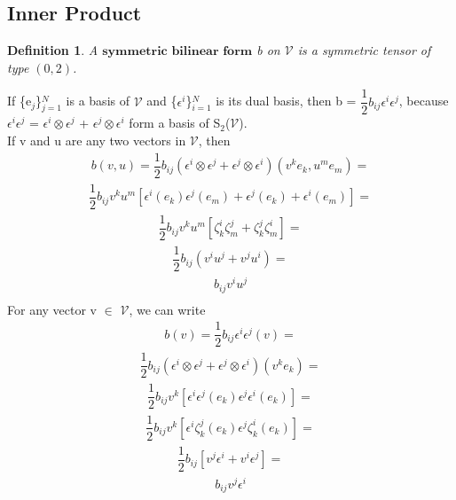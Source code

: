 \documentclass[12pt,a4paper]{article}
\newtheorem{defn}[thm]{Definition}
\begin{document}
\subsection{Inner Product}
\begin{defn}
A $\textbf{symmetric bilinear form}$ b on $\mathcal{V}$ is a symmetric tensor of type $(0, 2)$.
\end{defn}
\indent If \{e$_j$\}$^N_{j=1}$ is a basis of $\mathcal{V}$ and \{$\epsilon^i$\}$^N_{i=1}$ is its dual basis, then b = $\dfrac{1}{2}b_{ij}\epsilon^i\epsilon^j$, because $\epsilon^i \epsilon^j $ = $\epsilon^i \otimes \epsilon^j$ + $\epsilon^j \otimes \epsilon^i$ form a basis of S$_2$($\mathcal{V}$). \\
If v and u are any two vectors in $\mathcal{V}$, then
\begin{align*} \label{prop2}
b(v,u) = \dfrac{1}{2}b_{ij}(\epsilon^i \otimes \epsilon^j + \epsilon^j \otimes \epsilon^i)(v^k e_k , u^m e_m)=
\end{align*}
\begin{align*}
\dfrac{1}{2}b_{ij}v^k u^m [ \epsilon^i (e_k) \epsilon^j (e_m) + \epsilon^j (e_k) + \epsilon^i (e_m)]=
\end{align*}
\begin{align*}
\dfrac{1}{2}b_{ij}v^k u^m [ \zeta_k^i \zeta_m^j + \zeta_k^j \zeta_m^i]=
\end{align*}
\begin{align*}
\dfrac{1}{2}b_{ij} ( v^i u ^j + v^j u^i)  =
\end{align*}
\begin{align*}
 b_{ij} v^i u^j\\
\end{align*}
For any vector v $\in$ $\mathcal{V}$, we can write
\begin{align*}
b(v) = \dfrac{1}{2}b_{ij} \epsilon^i \epsilon^j (v) =
\end{align*}
\begin{align*}
 \dfrac{1}{2}b_{ij}(\epsilon^i \otimes \epsilon^j + \epsilon^j \otimes \epsilon^i)(v^k e_k )=
 \end{align*}
 \begin{align*}
\dfrac{1}{2}b_{ij}v^k [ \epsilon^i \epsilon^j (e_k) \epsilon^j  \epsilon^i (e_k) ]=
\end{align*}
\begin{align*}
\dfrac{1}{2}b_{ij}v^k [ \epsilon^i \zeta_k^j (e_k) \epsilon^j  \zeta^i_k (e_k) ]=
\end{align*}
\begin{align*}
\dfrac{1}{2}b_{ij} [ v^j \epsilon ^i + v^i \epsilon^j]=
\end{align*}
\begin{align*}
b_{ij}v^j\epsilon^i 
\end{align*}
\end{document}
